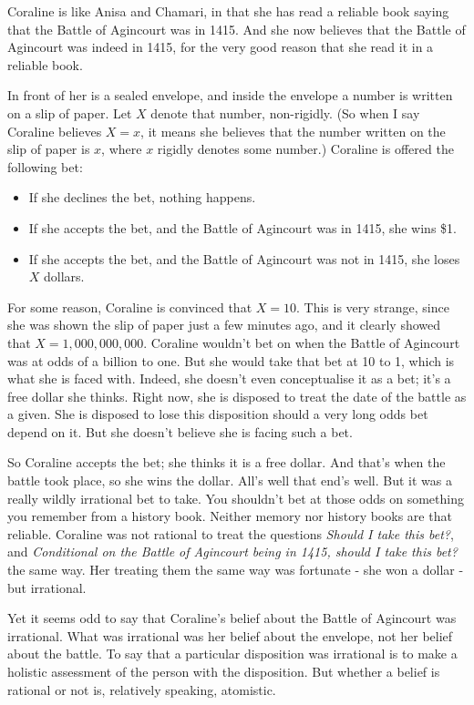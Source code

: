 \documentclass[11pt,]{book}
\providecommand{\tightlist}{%
  \setlength{\itemsep}{0pt}\setlength{\parskip}{0pt}}
\begin{document}
Coraline is like Anisa and Chamari, in that she has read a reliable book saying that the Battle of Agincourt was in 1415. And she now believes that the Battle of Agincourt was indeed in 1415, for the very good reason that she read it in a reliable book.

In front of her is a sealed envelope, and inside the envelope a number is written on a slip of paper. Let \(X\) denote that number, non-rigidly. (So when I say Coraline believes \(X = x\), it means she believes that the number written on the slip of paper is \(x\), where \(x\) rigidly denotes some number.) Coraline is offered the following bet:

\begin{itemize}
\tightlist
\item
  If she declines the bet, nothing happens.
\item
  If she accepts the bet, and the Battle of Agincourt was in 1415, she wins \$1.
\item
  If she accepts the bet, and the Battle of Agincourt was not in 1415, she loses \(X\) dollars.
\end{itemize}

For some reason, Coraline is convinced that \(X = 10\). This is very strange, since she was shown the slip of paper just a few minutes ago, and it clearly showed that \(X = 1,000,000,000\). Coraline wouldn't bet on when the Battle of Agincourt was at odds of a billion to one. But she would take that bet at 10 to 1, which is what she is faced with. Indeed, she doesn't even conceptualise it as a bet; it's a free dollar she thinks. Right now, she is disposed to treat the date of the battle as a given. She is disposed to lose this disposition should a very long odds bet depend on it. But she doesn't believe she is facing such a bet.

So Coraline accepts the bet; she thinks it is a free dollar. And that's when the battle took place, so she wins the dollar. All's well that end's well. But it was a really wildly irrational bet to take. You shouldn't bet at those odds on something you remember from a history book. Neither memory nor history books are that reliable. Coraline was not rational to treat the questions \emph{Should I take this bet?}, and \emph{Conditional on the Battle of Agincourt being in 1415, should I take this bet?} the same way. Her treating them the same way was fortunate - she won a dollar - but irrational.

Yet it seems odd to say that Coraline's belief about the Battle of Agincourt was irrational. What was irrational was her belief about the envelope, not her belief about the battle. To say that a particular disposition was irrational is to make a holistic assessment of the person with the disposition. But whether a belief is rational or not is, relatively speaking, atomistic.
\end{document}
